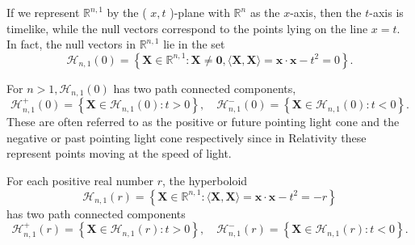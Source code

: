 \documentclass[10pt, letterpaper]{article}
\begin{document}
If we represent $\mathbb{R}^{n, 1}$ by the ( $x, t$ )-plane with $\mathbb{R}^{n}$ as the $x$-axis, then the $t$-axis is timelike, while the null vectors correspond to the points lying on the line $x=t$. In fact, the null vectors in $\mathbb{R}^{n, 1}$ lie in the set
$$
\mathcal{H}_{n, 1}(0)=\left\{\mathbf{X} \in \mathbb{R}^{n, 1}: \mathbf{X} \neq \mathbf{0},\langle\mathbf{X}, \mathbf{X}\rangle=\mathbf{x} \cdot \mathbf{x}-t^{2}=0\right\} .
$$

For $n>1, \mathcal{H}_{n, 1}(0)$ has two path connected components,
$$
\mathcal{H}_{n, 1}^{+}(0)=\left\{\mathbf{X} \in \mathcal{H}_{n, 1}(0): t>0\right\}, \quad \mathcal{H}_{n, 1}^{-}(0)=\left\{\mathbf{X} \in \mathcal{H}_{n, 1}(0): t<0\right\} .
$$
These are often referred to as the positive or future pointing light cone and the negative or past pointing light cone respectively since in Relativity these represent points moving at the speed of light.

For each positive real number $r$, the hyperboloid
$$
\mathcal{H}_{n, 1}(r)=\left\{\mathbf{X} \in \mathbb{R}^{n, 1}:\langle\mathbf{X}, \mathbf{X}\rangle=\mathbf{x} \cdot \mathbf{x}-t^{2}=-r\right\}
$$
has two path connected components
$$
\mathcal{H}_{n, 1}^{+}(r)=\left\{\mathbf{X} \in \mathcal{H}_{n, 1}(r): t>0\right\}, \quad \mathcal{H}_{n, 1}^{-}(r)=\left\{\mathbf{X} \in \mathcal{H}_{n, 1}(r): t<0\right\} .
$$
\end{document}
